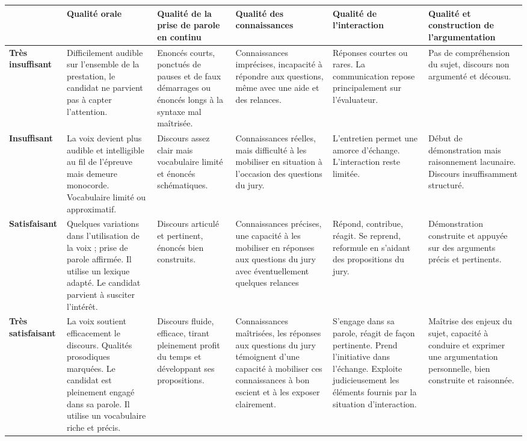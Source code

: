 \documentclass[oneside,12pt]{article}          %
\begin{document}
{\small
\begin{center}
	\begin{tabular}{| P{2cm} | P{3cm} | P{3cm} | P{3cm} | P{3cm} | P{3cm} |} \hline
		& \textbf{Qualité orale} & \textbf{Qualité de la prise de parole en continu} & \textbf{Qualité des connaissances} & \textbf{Qualité de l'interaction} & \textbf{Qualité et construction de l'argumentation} \\ \hline
		 \textbf{Très insuffisant} &
		Difficilement audible sur l'ensemble de la prestation, le candidat ne parvient pas à capter l'attention. &
		Enoncés courts, ponctués de pauses et de faux démarrages ou énoncés longs à la syntaxe mal maîtrisée. &
		Connaissances imprécises, incapacité à répondre aux questions, même avec une aide et des relances. &
		Réponses courtes ou rares. La communication repose principalement sur l'évaluateur. &
		Pas de compréhension du sujet, discours non argumenté et décousu. \\ \hline
		 \textbf{Insuffisant} &
		La voix devient plus audible et intelligible au fil de l'épreuve mais demeure monocorde. Vocabulaire limité ou approximatif. &
		Discours assez clair mais vocabulaire limité et énoncés schématiques. &
		Connaissances réelles, mais difficulté à les mobiliser en situation à l'occasion des questions du jury. &
		L'entretien permet une amorce d'échange. L'interaction reste limitée. &
		Début de démonstration mais raisonnement lacunaire. Discours insuffisamment structuré. \\ \hline
		 \textbf{Satisfaisant} &
		Quelques variations dans l'utilisation de la voix ; prise de parole affirmée. Il utilise un lexique adapté. Le candidat parvient à susciter l'intérêt. &
		Discours articulé et pertinent, énoncés bien construits. &
		Connaissances précises, une capacité à les mobiliser en réponses aux questions du jury avec éventuellement quelques relances &
		Répond, contribue, réagit. Se reprend, reformule en s'aidant des propositions du jury. &
		Démonstration construite et appuyée sur des arguments précis et pertinents. \\ \hline
		\textbf{Très satisfaisant} &
		La voix soutient efficacement le discours. Qualités prosodiques marquées. Le candidat est pleinement engagé dans sa parole. Il utilise un vocabulaire riche et précis. &
		Discours fluide, efficace, tirant pleinement profit du temps et développant ses propositions. &
		Connaissances maîtrisées, les réponses aux questions du jury témoignent d'une capacité à mobiliser ces connaissances à bon escient et à les exposer clairement. &
		S'engage dans sa parole, réagit de façon pertinente. Prend l'initiative dans l'échange. Exploite judicieusement les éléments fournis par la situation d'interaction. &
		Maîtrise des enjeux du sujet, capacité à conduire et exprimer une argumentation personnelle, bien construite et raisonnée. \\ \hline
	\end{tabular}
\end{center}
}
\end{document}
